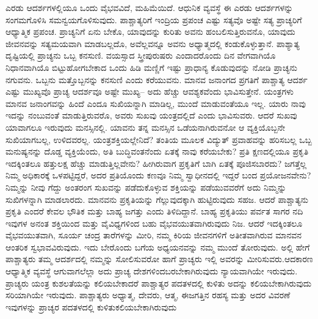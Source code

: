ಎರಡು ಆದರ್ಶಗಳಲ್ಲಿಯೂ ಒಂದು ವೈಭವವಿದೆ, ಮಹಿಮೆಯಿದೆ. ಆಧುನಿಕ ವ್ಯವಸ್ಥೆ ಈ ಎರಡು ಆದರ್ಶಗಳನ್ನು ಸಂಗಮಗೊಳಿಸಿ ಸಮನ್ವಯಗೊಳಿಸುವುದು. ಪಾಶ್ಚಾತ್ಯರಿಗೆ ಇಂದ್ರಿಯ ಪ್ರಪಂಚ ಎಷ್ಟು ಸತ್ಯವೊ ಅಷ್ಟೇ ಸತ್ಯ ಪ್ರಾಚ್ಯರಿಗೆ ಆಧ್ಯಾತ್ಮಿಕ ಪ್ರಪಂಚ. ಪ್ರಾಚ್ಯನಿಗೆ ಏನು ಬೇಕೊ, ಯಾವುದನ್ನು ಕುರಿತು ಅವನು ಹಂಬಲಿಸುತ್ತಿರುವನೊ, ಯಾವುದು ಜೀವನವನ್ನು ಸತ್ಯಮಯವಾಗಿ ಮಾಡಬಲ್ಲದೊ, ಅವೆಲ್ಲವನ್ನೂ ಅವನು ಅಧ್ಯಾತ್ಮದಲ್ಲಿ ಕಂಡುಕೊಳ್ಳುತ್ತಾನೆ. ಪಾಶ್ಯಾತ್ಯ ದೃಷ್ಟಿಯಲ್ಲಿ ಪ್ರಾಚ್ಯನು ಒಬ್ಬ ಕನಸುಣಿ. ವಯಸ್ಸಾದ ಸ್ತ್ರೀಪುರುಷರು ಎಂದಾದರೊಂದು ದಿನ ವೇಗವಾಗಿಯೊ ನಿಧಾನವಾಗಿಯೊ ಬಿಟ್ಟುಹೋಗಬೇಕಾದ ಒಂದು ಹಿಡಿ ಮಣ್ಣಿಗೆ ಇಷ್ಟು ಪ್ರಾಧಾನ್ಯ ಕೊಡುವುದನ್ನು ನೋಡಿ ಪ್ರಾಚ್ಯನು ನಗುವನು. ಒಬ್ಬನು ಮತ್ತೊಬ್ಬನನ್ನು ಕನಸುಣಿ ಎಂದು ಕರೆಯುವನು. ಮಾನವ ಜನಾಂಗದ ಪ್ರಗತಿಗೆ ಪಾಶ್ಚಾತ್ಯ ಆದರ್ಶ ಎಷ್ಟು ಮುಖ್ಯವೊ ಪ್ರಾಚ್ಯ ಆದರ್ಶವೂ ಅಷ್ಟೇ ಮುಖ್ಯ– ಅದು ಹೆಚ್ಚು ಆವಶ್ಯಕವೆಂದು ಭಾವಿಸುತ್ತೇನೆ. ಯಂತ್ರಗಳು ಮಾನವ ಜನಾಂಗವನ್ನು ಹಿಂದೆ ಎಂದೂ ಸುಖಿಯನ್ನಾಗಿ ಮಾಡಿಲ್ಲ, ಮುಂದೆ ಮಾಡುವಂತೆಯೂ ಇಲ್ಲ. ಯಾರು ನಾವು ಇದನ್ನು ನಂಬುವಂತೆ ಮಾಡುತ್ತಿರುವರೊ, ಅವರು ಸುಖವು ಯಂತ್ರದಲ್ಲಿದೆ ಎಂದು ಭಾವಿಸುವರು. ಆದರೆ ಸುಖವು ಯಾವಾಗಲೂ ಇರುವುದು ಮನಸ್ಸಿನಲ್ಲಿ. ಯಾವನು ತನ್ನ ಮನಸ್ಸಿನ ಒಡೆಯನಾಗಿರುವನೋ ಆ ವ್ಯಕ್ತಿಯೊಬ್ಬನೇ ಸುಖಿಯಾಗಬಲ್ಲ, ಉಳಿದವರಲ್ಲ. ಯಂತ್ರಶಕ್ತಿಯಲ್ಲೇನಿದೆ? ತಂತಿಯ ಮೂಲಕ ವಿದ್ಯುತ್​ ಪ್ರವಾಹವನ್ನು ಹರಿಸಬಲ್ಲ ಒಬ್ಬ ಮನುಷ್ಯನನ್ನು ದೊಡ್ಡ ವ್ಯಕ್ತಿಯೆಂದು, ಅತಿ ಬುದ್ಧಿವಂತನೆಂದು ಏತಕ್ಕೆ ನಾವು ಕರೆಯಬೇಕು? ಪ್ರತಿ ಕ್ಷಣದಲ್ಲಿಯೂ ಪ್ರಕೃತಿ ಇದಕ್ಕಿಂತಲೂ ಹತ್ತುಲಕ್ಷ ಹೆಚ್ಚು ಮಾಡುತ್ತಿಲ್ಲವೇನು? ಹೀಗಿರುವಾಗ ಪ್ರಕೃತಿಗೆ ಬಾಗಿ ಏತಕ್ಕೆ ಪೂಜಿಸಬಾರದು? ಜಗತ್ತೆಲ್ಲ ನಿಮ್ಮ ಅಧಿಕಾರಕ್ಕೆ ಒಳಪಟ್ಟಿದ್ದರೆ, ಅದರ ಪ್ರತಿಯೊಂದು ಕಣವೂ ನಿಮ್ಮ ಸ್ವಾಧೀನದಲ್ಲಿ ಇದ್ದರೆ ಬಂದ ಪ್ರಯೋಜನವೇನು? ನಿಮ್ಮನ್ನು ನೀವು ಗೆದ್ದು ಅಂತರಂಗ ಸುಖವನ್ನು ಪಡೆದುಕೊಳ್ಳುವ ಶಕ್ತಿಯನ್ನು ಪಡೆಯುವವರೆಗೆ ಅದು ನಿಮ್ಮನ್ನು ಸುಖಿಗಳನ್ನಾಗಿ ಮಾಡಲಾರದು. ಮಾನವನು ಪ್ರಕೃತಿಯನ್ನು ಗೆಲ್ಲುವುದಕ್ಕಾಗಿ ಹುಟ್ಟಿರುವುದು ಸಹಜ. ಆದರೆ ಪಾಶ್ಚಾತ್ಯನು ಪ್ರಕೃತಿ ಎಂದರೆ ಕೇವಲ ಭೌತಿಕ ಮತ್ತು ಬಾಹ್ಯ ಜಗತ್ತು ಎಂದು ತಿಳಿದಿದ್ದಾನೆ. ಬಾಹ್ಯ ಪ್ರಕೃತಿಯು ಪರ್ವತ ಸಾಗರ ನದಿ ಇವುಗಳ ಅನಂತ ಶಕ್ತಿಯಿಂದ ಮತ್ತು ವೈವಿಧ್ಯಗಳಿಂದ ಬಹು ವೈಭವಯುತವಾಗಿರುವುದು ನಿಜ. ಆದರೆ ಇದಕ್ಕಿಂತಲೂ ವೈಭವಯುತವಾಗಿ, ಸೂರ್ಯ ಚಂದ್ರ ತಾರೆಗಳನ್ನು ಮೀರಿ, ನಮ್ಮ ಕಿರಿಯ ಜೀವನಗಳಿಗೆ ಅತೀತವಾಗಿರುವ ಮಾನವನ ಆಂತರಿಕ ಸ್ವಭಾವವಿರುವುದು. ಇದು ಬೇರೊಂದು ಬಗೆಯ ಅಧ್ಯಯನವನ್ನು ನಮ್ಮ ಮುಂದೆ ತೋರುವುದು. ಅಲ್ಲಿ ಹೇಗೆ ಪಾಶ್ಚಾತ್ಯರು ತಮ್ಮ ಆದರ್ಶದಲ್ಲಿ ನಮ್ಮನ್ನು ಸೋಲಿಸುವರೋ ಹಾಗೆ ಪ್ರಾಚ್ಯರು ಇಲ್ಲಿ ಅವರನ್ನು ಮೀರಿಸುವರು.\break ಆದಕಾರಣ ಆಧ್ಯಾತ್ಮಿಕ ವ್ಯವಸ್ಥೆ ಆಗುವಾಗಲೆಲ್ಲಾ ಅದು ಪ್ರಾಚ್ಯ ದೇಶಗಳಿಂದ\break ಬರಬೇಕಾಗಿರುವುದು ನ್ಯಾಯವಾಗಿಯೇ ಇರುವುದು. ಪ್ರಾಚ್ಯರು ಯಂತ್ರ ಕುಶಲತೆಯನ್ನು ಕಲಿಯಬೇಕಾದರೆ ಪಾಶ್ಚಾತ್ಯರ ಪದತಳದಲ್ಲಿ ಕುಳಿತು ಅದನ್ನು ಕಲಿಯಬೇಕಾ\-ಗಿರುವುದು ಸರಿಯಾಗಿಯೇ ಇರುವುದು. ಪಾಶ್ಚಾತ್ಯರು ಅಧ್ಯಾತ್ಮ, ದೇವರು, ಆತ್ಮ, ಈ\break ಜಗತ್ತಿನ ರಹಸ್ಯ ಮತ್ತು ಅದರ ವಿವರಣೆ ಇವುಗಳನ್ನು ಪ್ರಾಚ್ಯರ ಪದತಳದಲ್ಲಿ ಕುಳಿತು\break ಕಲಿಯಬೇಕಾಗಿರುವುದು

